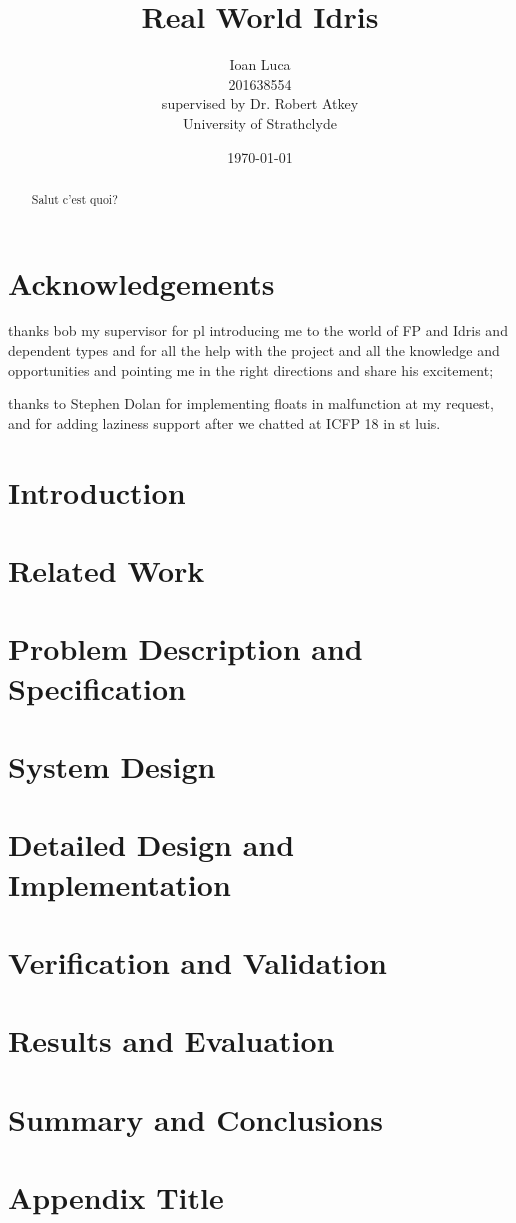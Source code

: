 \documentclass[a4paper, 12pt, oneside]{report}
\title{Real World Idris}
\author{Ioan Luca \\ 201638554 \\ \small supervised by Dr. Robert Atkey \\
	\small University of Strathclyde} %
\date{\today}
\begin{document}
\maketitle


\listoffigures
\listoftables

\chapter*{Acknowledgements}
 thanks bob my supervisor for pl introducing me to the world of FP and Idris and dependent types and for all the help with the project and all the knowledge and opportunities and  pointing me in the right directions and share his excitement;

 thanks to Stephen Dolan for implementing floats in malfunction at my request, and for adding laziness support after we chatted at ICFP 18 in st luis.

\begin{abstract}
    Salut c'est quoi?
\end{abstract}

\tableofcontents


\chapter{Introduction}
\label{ch:intro}


\chapter{Related Work}
\label{ch:techintro}

\chapter{Problem Description and Specification}
\label{ch:method}

\chapter{System Design}
\label{ch:results}

\chapter{Detailed Design and Implementation}
\label{ch:conc}

\chapter{Verification and Validation}

\chapter{Results and Evaluation}

\chapter{Summary and Conclusions}

\appendix
\chapter{Appendix Title}




\end{document}
